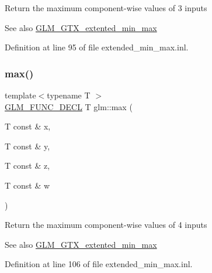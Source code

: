 Return the maximum component-\/wise values of 3 inputs \begin{DoxySeeAlso}{See also}
\mbox{\hyperlink{group__gtx__extented__min__max}{G\+L\+M\+\_\+\+G\+T\+X\+\_\+extented\+\_\+min\+\_\+max}} 
\end{DoxySeeAlso}


Definition at line 95 of file extended\+\_\+min\+\_\+max.\+inl.

\mbox{\label{group__gtx__extented__min__max_ga78e04a0cef1c4863fcae1a2130500d87}} 
\subsubsection{\texorpdfstring{max()}{max()}\hspace{0.1cm}{\footnotesize\ttfamily [4/6]}}
{\footnotesize\ttfamily template$<$typename T $>$ \\
\mbox{\hyperlink{setup_8hpp_ab2d052de21a70539923e9bcbf6e83a51}{G\+L\+M\+\_\+\+F\+U\+N\+C\+\_\+\+D\+E\+CL}} T glm\+::max (\begin{DoxyParamCaption}\item[{T const \&}]{x,  }\item[{T const \&}]{y,  }\item[{T const \&}]{z,  }\item[{T const \&}]{w }\end{DoxyParamCaption})}

Return the maximum component-\/wise values of 4 inputs \begin{DoxySeeAlso}{See also}
\mbox{\hyperlink{group__gtx__extented__min__max}{G\+L\+M\+\_\+\+G\+T\+X\+\_\+extented\+\_\+min\+\_\+max}} 
\end{DoxySeeAlso}


Definition at line 106 of file extended\+\_\+min\+\_\+max.\+inl.

\mbox{\label{group__gtx__extented__min__max_ga7cca8b53cfda402040494cdf40fbdf4a}} 
